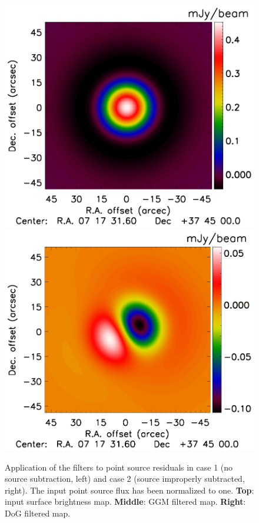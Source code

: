 \documentclass[twocolumn,traditabstract]{aa}
\begin{document}
\begin{figure}[h]
\includegraphics[trim=0cm 0.7cm 0cm 0cm, clip=true, totalheight=3.4cm]{Figure/PSalone_DoG_PointSource_15_15_45.pdf}
\includegraphics[trim=0cm 0.7cm 0cm 0cm, clip=true, totalheight=3.4cm]{Figure/PSalone_DoG_PointSourceResidual_15_15_45.pdf}
\caption{\footnotesize{Application of the filters to point source residuals in case 1 (no source subtraction, left) and case 2 (source improperly subtracted, right). The input point source flux has been normalized to one. {\bf Top}: input surface brightness map. {\bf Middle}: GGM filtered map. {\bf Right}: DoG filtered map.}}
\label{fig:Point_source_maps}
\end{figure}
\end{document}
